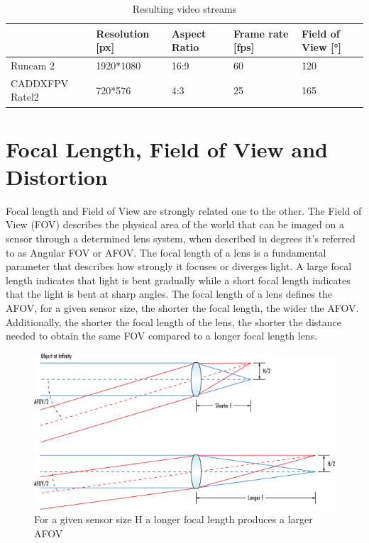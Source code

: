 \begin{table}[h]
\centering
\caption{Resulting video streams}
\label{tab:cam_table}
\begin{tabular}{l|l|l|l|l|}
  \cline{2-5}
                                        & \cellcolor[HTML]{C0C0C0}Resolution {[}px{]} & \cellcolor[HTML]{C0C0C0}Aspect Ratio & \cellcolor[HTML]{C0C0C0}Frame rate {[}fps{]} & \cellcolor[HTML]{C0C0C0}Field of View {[}°{]} \\ \hline
  \multicolumn{1}{|l|}{Runcam 2}        & 1920*1080                                   & 16:9                                 & 60                                           & 120                                           \\ \hline
  \multicolumn{1}{|l|}{CADDXFPV Ratel2} & 720*576                                     & 4:3                                  & 25                                           & 165                                           \\ \hline
  \end{tabular}
\end{table}




\section{Focal Length, Field of View and Distortion}
\label{sec:distortion_fl}

Focal length and Field of View are strongly related one to the other. The Field of View (FOV) describes the physical area of the world that can be imaged on a sensor through a determined lens system, when described in degrees it's referred to as Angular FOV or AFOV.
The focal length of a lens is a fundamental parameter that describes how strongly it focuses or diverges light. A large focal length indicates that light is bent gradually while a short focal length indicates that the light is bent at sharp angles.
The focal length of a lens defines the AFOV, for a given sensor size, the shorter the focal length, the wider the AFOV. Additionally, the shorter the focal length of the lens, the shorter the distance needed to obtain the same FOV compared to a longer focal length lens\cite{flength}.

\begin{figure}[h]
  \centering
  \includegraphics[scale=0.5]{figures/AFOV.png}
  \caption{For a given sensor size H a longer focal length produces a larger AFOV}
\end{figure}

